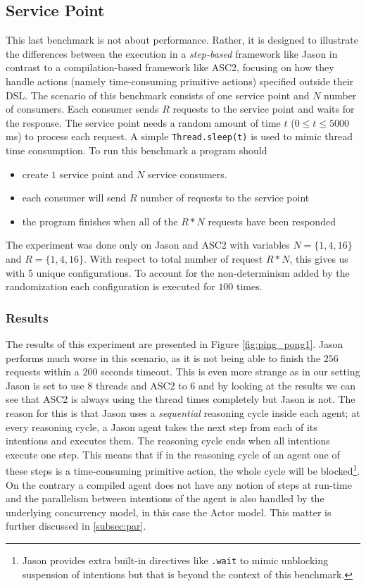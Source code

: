 \subsection{Service Point}
This last benchmark is not about performance. Rather, it is designed to illustrate the differences between the execution in a \textit{step-based} framework like Jason in contrast to a compilation-based framework like ASC2, focusing on how they handle actions (namely time-consuming primitive actions) specified outside their DSL. The scenario of this benchmark consists of one service point and $N$ number of consumers. Each consumer sends $R$ requests to the service point and waits for the response. The service point needs a random  amount of time $t$ ($0 \le t \le 5000$ ms) to process each request. A simple \verb+Thread.sleep(t)+ is used to mimic thread time consumption. To run this benchmark a program should
\begin{itemize}
    \item create $1$ service point and $N$ service consumers.
    \item each consumer will send $R$ number of requests to the service point
    \item the program finishes when all of the $R*N$ requests have been responded 
\end{itemize}
The experiment was done only on Jason and ASC2 with variables $N=\{1,4,16\}$ and $R=\{1,4,16\}$. With respect to total number of request $R*N$, this gives us with 5 unique configurations. To account for the non-determinism added by the randomization each configuration is executed for $100$ times.

\subsubsection{Results}
The results of this experiment are presented in Figure \ref{fig:ping_pong1}. Jason performs much worse in this scenario, as it is not being able to finish the $256$ requests within a $200$ seconds timeout. This is even more strange as in our setting Jason is set to use $8$ threads and ASC2 to $6$ and by looking at the results we can see that ASC2 is always using the thread times completely but Jason is not. The reason for this is that Jason uses a \textit{sequential} reasoning cycle inside each agent; %
at every reasoning cycle, a Jason agent takes the next step from each of its intentions and executes them. The reasoning cycle ends when all intentions execute one step. This means that if in the reasoning cycle of an agent one of these steps is a time-consuming primitive action, the whole cycle will be blocked\footnote{Jason provides extra built-in directives like \texttt{.wait} to mimic unblocking suspension of intentions but that is beyond the context of this benchmark.}. On the contrary a compiled agent does not have any notion of steps at run-time and the parallelism between intentions of the agent is also handled by the underlying concurrency model, in this case the Actor model. This matter is further discussed in \ref{subsec:par}.

